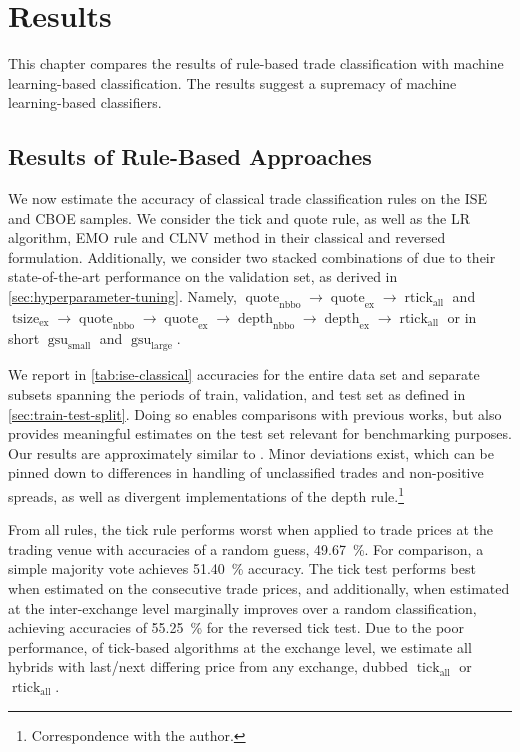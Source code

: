 \section{Results}\label{sec:results}

This chapter compares the results of rule-based trade classification with machine learning-based classification. The results suggest a supremacy of machine learning-based classifiers.

\subsection{Results of Rule-Based Approaches}\label{sec:result-of-rule-based-approaches}

We now estimate the accuracy of classical trade classification rules on the \gls{ISE} and \gls{CBOE} samples. We consider the tick and quote rule, as well as the \gls{LR} algorithm, \gls{EMO} rule and \gls{CLNV} method in their classical and reversed formulation. Additionally, we consider two stacked combinations of \textcite[][12--14]{grauerOptionTradeClassification2022} due to their state-of-the-art performance on the validation set, as derived in \cref{sec:hyperparameter-tuning}. Namely, $\operatorname{quote}_{\mathrm{nbbo}} \to \operatorname{quote}_{\mathrm{ex}} \to \operatorname{rtick}_{\mathrm{all}}$ and $\operatorname{tsize}_{\mathrm{ex}} \to \operatorname{quote}_{\mathrm{nbbo}} \to \operatorname{quote}_{\mathrm{ex}} \to \operatorname{depth}_{\mathrm{nbbo}} \to \operatorname{depth}_{\mathrm{ex}} \to \operatorname{rtick}_{\mathrm{all}}$ or in short $\operatorname{gsu}_{\mathrm{small}}$ and $\operatorname{gsu}_{\mathrm{large}}$.

We report in \cref{tab:ise-classical} accuracies for the entire data set and separate subsets spanning the periods of train, validation, and test set as defined in \cref{sec:train-test-split}. Doing so enables comparisons with previous works, but also provides meaningful estimates on the test set relevant for benchmarking purposes. Our results are approximately similar to \textcite[][29--33]{grauerOptionTradeClassification2022}. Minor deviations exist, which can be pinned down to differences in handling of unclassified trades and non-positive spreads, as well as divergent implementations of the depth rule.\footnote{Correspondence with the author.}

From all rules, the tick rule performs worst when applied to trade prices at the trading venue with accuracies of a random guess, \SI{49.67}{\percent}. For comparison, a simple majority vote achieves \SI{51.40}{\percent} accuracy. The tick test performs best when estimated on the consecutive trade prices, and additionally, when estimated at the inter-exchange level marginally improves over a random classification, achieving accuracies of \SI{55.25}{\percent} for the reversed tick test. Due to the poor performance, of tick-based algorithms at the exchange level, we estimate all hybrids with last/next differing price from any exchange, dubbed $\operatorname{tick}_{\mathrm{all}}$ or $\operatorname{rtick}_{\mathrm{all}}$.

